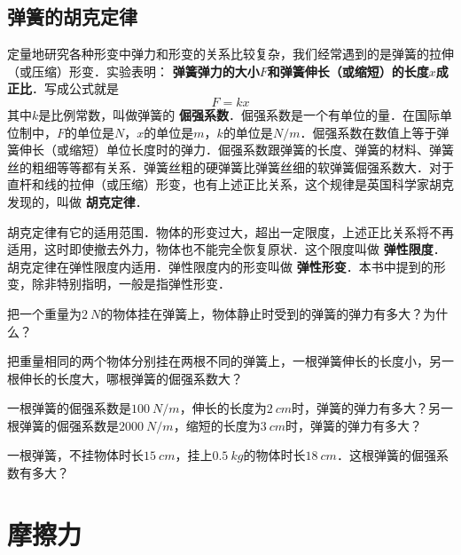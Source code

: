 \subsection{弹簧的胡克定律}

定量地研究各种形变中弹力和形变的关系比较复杂，我们经常遇到的是弹簧的拉伸（或压缩）形变．实验表明：\textbf{ 弹簧弹力的大小$F$和弹簧伸长（或缩短）的长度$x$成正比}．写成公式就是
\begin{equation}
    F=kx
\end{equation}
其中$k$是比例常数，叫做弹簧的\textbf{ 倔强系数}．倔强系数是一个有单位的量．在国际单位制中，$F$的单位是$\unit{N}$，$x$的单位是$\unit{m}$，$k$的单位是$\unit{N/m}$．倔强系数在数值上等于弹簧伸长（或缩短）单位长度时的弹力．倔强系数跟弹簧的长度、弹簧的材料、弹簧丝的粗细等等都有关系．弹簧丝粗的硬弹簧比弹簧丝细的软弹簧倔强系数大．对于直杆和线的拉伸（或压缩）形变，也有上述正比关系，这个规律是英国科学家胡克发现的，叫做\textbf{ 胡克定律}．

胡克定律有它的适用范围．物体的形变过大，超出一定限度，上述正比关系将不再适用，这时即使撤去外力，物体也不能完全恢复原状．这个限度叫做\textbf{ 弹性限度}．胡克定律在弹性限度内适用．弹性限度内的形变叫做\textbf{ 弹性形变}．本书中提到的形变，除非特别指明，一般是指弹性形变．


\begin{Exercise}
	\begin{QsNum}
    	\item 把一个重量为$\qty{2}{N}$的物体挂在弹簧上，物体静止时受到的弹簧的弹力有多大？为什么？
    	\item 把重量相同的两个物体分别挂在两根不同的弹簧上，一根弹簧伸长的长度小，另一根伸长的长度大，哪根弹簧的倔强系数大？
    	\item 一根弹簧的倔强系数是$\qty{100}{N/m}$，伸长的长度为$\qty{2}{cm}$时，弹簧的弹力有多大？另一根弹簧的倔强系数是$\qty{2000}{N/m}$，缩短的长度为$\qty{3}{cm}$时，弹簧的弹力有多大？
    	\item 一根弹簧，不挂物体时长$\qty{15}{cm}$，挂上$\qty{0.5}{kg}$的物体时长$\qty{18}{cm}$．这根弹簧的倔强系数有多大？
	\end{QsNum}
\end{Exercise}


\begin{Thinking}
	\lipsum[2]
\end{Thinking}



\section{摩擦力}

